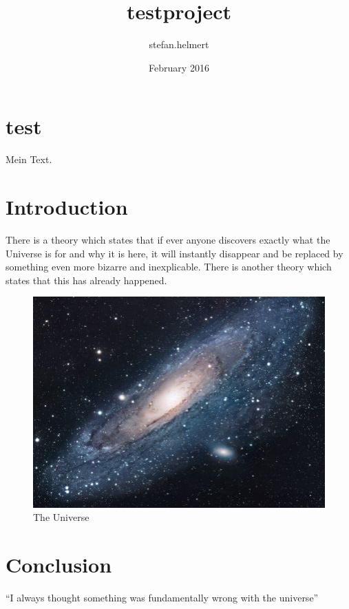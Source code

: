 \documentclass{article}
\title{testproject}
\author{stefan.helmert }
\date{February 2016}
\begin{document}
\maketitle

\section{test}
Mein Text.

\section{Introduction}
There is a theory which states that if ever anyone discovers exactly what the Universe is for and why it is here, it will instantly disappear and be replaced by something even more bizarre and inexplicable.
There is another theory which states that this has already happened.

\begin{figure}[h!]
\centering
\includegraphics[scale=1.7]{universe.jpg}
\caption{The Universe}
\label{fig:univerise}
\end{figure}

\section{Conclusion}
``I always thought something was fundamentally wrong with the universe'' \citep{adams1995hitchhiker}



\end{document}

